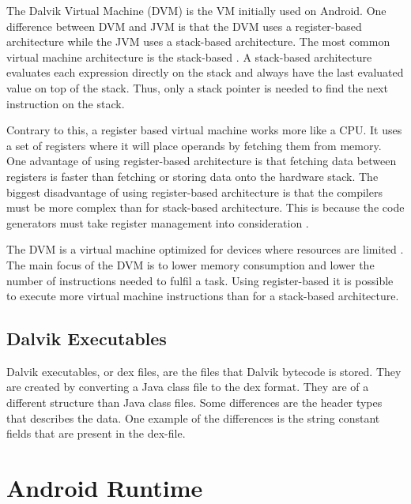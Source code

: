 
The Dalvik Virtual Machine (DVM) is the VM initially used on Android. One difference between DVM and JVM is that the DVM uses a register-based architecture while the JVM uses a stack-based architecture. The most common virtual machine architecture is the stack-based \cite[p.~158]{craig2010virtual}. A stack-based architecture evaluates each expression directly on the stack and always have the last evaluated value on top of the stack. Thus, only a stack pointer is needed to find the next instruction on the stack.

Contrary to this, a register based virtual machine works more like a CPU. It uses a set of registers where it will place operands by fetching them from memory. One advantage of using register-based architecture is that fetching data between registers is faster than fetching or storing data onto the hardware stack. The biggest disadvantage of using register-based architecture is that the compilers must be more complex than for stack-based architecture. This is because the code generators must take register management into consideration \cite[p.~159-160]{craig2010virtual}.

The DVM is a virtual machine optimized for devices where resources are limited \cite{android:dalvik:internals}. The main focus of the DVM is to lower memory consumption and lower the number of instructions needed to fulfil a task. Using register-based it is possible to execute more virtual machine instructions than for a stack-based architecture\cite{shi2008virtual}. 



\subsection{Dalvik Executables}
Dalvik executables, or dex files, are the files that Dalvik bytecode is stored. They are created by converting a Java class file to the dex format. They are of a different structure than Java class files. Some differences are the header types that describes the data. One example of the differences is the string constant fields that are present in the dex-file. %


\section{Android Runtime}

